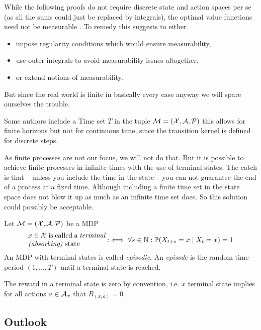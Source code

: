 \begin{remark}
	While the following proofs do not require discrete state and action spaces per se (as all the sums could just be replaced by integrals), the optimal value functions need not be measurable \parencite[157]{putermanMarkovDecisionProcesses2005} . To remedy this \citeauthor{putermanMarkovDecisionProcesses2005} suggests to either
	\begin{itemize}[noitemsep]
		\item impose regularity conditions which would ensure measurability,
		\item use outer integrals to avoid measurability issues altogether,
		\item or extend notions of measurability.
	\end{itemize}
	But since the real world is finite in basically every case anyway we will spare ourselves the trouble. 
\end{remark}

Some authors include a Time set \(T\) in the tuple \(\mathcal{M}=(\mathcal{X},\mathcal{A},\mathcal{P})\) \parencite[e.g.][]{putermanMarkovDecisionProcesses2005} this allows for finite horizons but not for continuous time, since the transition kernel is defined for discrete steps.


As finite processes are not our focus, we will not do that. But it is possible to achieve finite processes in infinite times with the use of terminal states. The catch is that -- unless you include the time in the state -- you can not guarantee the end of a process at a fixed time. Although including a finite time set in the state space does not blow it up as much as an infinite time set does. So this solution could possibly be acceptable.

\begin{definition} Let \(\mathcal{M}=(\mathcal{X},\mathcal{A},\mathcal{P})\) be a MDP
	\[
		\parbox{11em}{\(x\in\cX \) is called a \emph{terminal (absorbing)} state} :\iff \forall s\in\N: \Pr(X_{t+s}=x\mid X_t=x)=1
	\]
	An MDP with terminal states is called \emph{episodic}.
	An \emph{episode} is the random time period \((1,\dots,T)\) until a terminal state is reached.
\end{definition}
\begin{remark} The reward in a terminal state is zero by convention, i.e. \(x\) terminal state implies for all actions \(a\in\mathcal{A}_x\) that \(R_{(x,a)}=0\)
\end{remark}

\subsection{Outlook}

